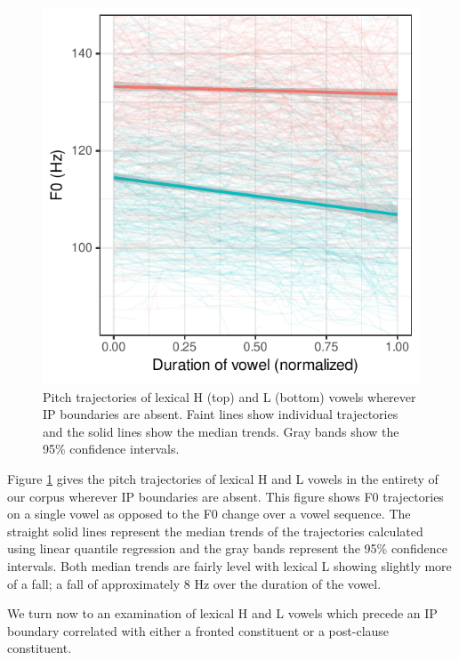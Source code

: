 \documentclass[
  11pt,
  b5paper,
]{article}
\begin{document}
\begin{figure}
\centering
\includegraphics{figure/vowel-pitch-HL-noboundary-manual-1.pdf}
\caption{Pitch trajectories of lexical H (top) and L (bottom) vowels
wherever IP boundaries are absent. Faint lines show individual
trajectories and the solid lines show the median trends. Gray bands show
the 95\% confidence intervals.
\label{fig:vowel_pitch_HL_noboundary_manual}}
\end{figure}

Figure \ref{fig:vowel_pitch_HL_noboundary_manual} gives the pitch
trajectories of lexical H and L vowels in the entirety of our corpus
wherever IP boundaries are absent. This figure shows F0 trajectories on
a single vowel as opposed to the F0 change over a vowel sequence. The
straight solid lines represent the median trends of the trajectories
calculated using linear quantile regression and the gray bands represent
the 95\% confidence intervals. Both median trends are fairly level with
lexical L showing slightly more of a fall; a fall of approximately 8 Hz
over the duration of the vowel.

We turn now to an examination of lexical H and L vowels which precede an
IP boundary correlated with either a fronted constituent or a
post-clause constituent.
\end{document}
